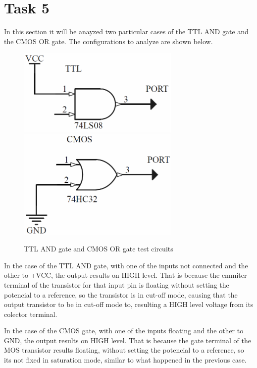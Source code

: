 \newpage 

\section*{Task 5}
In this section it will be anayzed two particular cases of the TTL AND gate and the CMOS OR gate.
The configurations to analyze are shown below.

\begin{figure}[H]
    \begin{centering}
    \includegraphics[width=0.7\textwidth]{data/TTL_EJ5}
    \includegraphics[width=0.7\textwidth]{data/CMOS_EJ5}
    \par\end{centering}
    \caption{TTL AND gate and CMOS OR gate test circuits}
\end{figure}

In the case of the TTL AND gate, with one of the inputs not connected and the other to +VCC,
 the output results on HIGH level. 
That is because the emmiter terminal of the transistor for that input pin is floating without setting 
the potencial to a reference, so the transistor is in cut-off mode, causing that the output 
transistor to be in cut-off mode to, resulting a HIGH level voltage from its colector terminal.

In the case of the CMOS gate, with one of the inputs floating and the other to GND, the output results 
on HIGH level.
That is because the gate terminal of the MOS transistor results floating, without setting the potencial
to a reference, so its not fixed in saturation mode, similar to what happened in the previous case.

